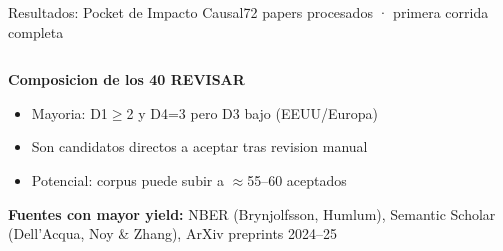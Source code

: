 \documentclass[aspectratio=169,10pt]{beamer}
\newenvironment{card}[1][cardbg]{%
  \begin{tcolorbox}[colback=#1,colframe=bidlight!40,arc=4pt,
    boxrule=0.4pt,left=5pt,right=5pt,top=4pt,bottom=4pt]}%
  {\end{tcolorbox}}
\begin{document}
\begin{frame}{Resultados: Pocket de Impacto Causal}{72 papers procesados · primera corrida completa}
\begin{columns}[T]
\begin{card}
\small\textbf{\color{bidaccent}Composicion de los 40 REVISAR}\\[3pt]
\scriptsize\color{bidgray}
\begin{itemize}\setlength\itemsep{3pt}
  \item Mayoria: D1$\geq$2 y D4=3 pero D3 bajo (EEUU/Europa)
  \item Son candidatos directos a aceptar tras revision manual
  \item Potencial: corpus puede subir a $\approx$55--60 aceptados
\end{itemize}
\vspace{3pt}
\textbf{\color{bidaccent}Fuentes con mayor yield:} NBER (Brynjolfsson, Humlum), Semantic Scholar (Dell'Acqua, Noy \& Zhang), ArXiv preprints 2024--25
\end{card}
\end{columns}
\end{frame}
\end{document}
